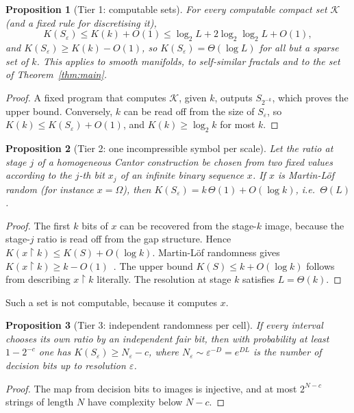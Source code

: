 \documentclass[11pt]{article}
\newtheorem{proposition}{Proposition}[section]
\theoremstyle{definition}\newtheorem{definition}{Definition}[section]
\theoremstyle{remark}\newtheorem*{remark}{Remark}
\newcommand{\Kc}{K}
\begin{document}
\begin{proposition}[Tier 1: computable sets]
\label{prop:tier1}
For every computable compact set $\mathcal K$ (and a fixed rule for discretising it),
\begin{equation}
\Kc(S_\varepsilon)\le\Kc(k)+O(1)\le\log_2L+2\log_2\log_2L+O(1),
\end{equation}
and $\Kc(S_\varepsilon)\ge\Kc(k)-O(1)$, so $\Kc(S_\varepsilon)=\Theta(\log L)$ for all but a sparse set of $k$. This
applies to smooth manifolds, to self-similar fractals and to the set of Theorem~\ref{thm:main}.
\end{proposition}
\begin{proof}
A fixed program that computes $\mathcal K$, given $k$, outputs $S_{2^{-k}}$, which proves the upper bound. Conversely, $k$ can be read
off from the size of $S_\varepsilon$, so $\Kc(k)\le\Kc(S_\varepsilon)+O(1)$, and $\Kc(k)\ge\log_2k$ for most $k$.
\end{proof}

\begin{proposition}[Tier 2: one incompressible symbol per scale]
\label{prop:tier2}
Let the ratio at stage $j$ of a homogeneous Cantor construction be chosen from two fixed values according to the
$j$-th bit $x_j$ of an infinite binary sequence $x$. If $x$ is Martin-L\"of random (for instance
$x=\Omega$), then $\Kc(S_\varepsilon)=k\,\Theta(1)+O(\log k)$, i.e.\ $\Theta(L)$.
\end{proposition}
\begin{proof}
The first $k$ bits of $x$ can be recovered from the stage-$k$ image, because the stage-$j$ ratio is read off from
the gap structure. Hence $\Kc(x\!\upharpoonright\!k)\le\Kc(S)+O(\log k)$. Martin-L\"of randomness gives
$\Kc(x\!\upharpoonright\!k)\ge k-O(1)$~\cite{Chaitin75,DowneyHirschfeldt}. The upper bound $\Kc(S)\le k+O(\log k)$ follows
from describing $x\!\upharpoonright\!k$ literally. The resolution at stage $k$ satisfies $L=\Theta(k)$.
\end{proof}
Such a set is not computable, because it computes $x$.

\begin{proposition}[Tier 3: independent randomness per cell]
\label{prop:tier3}
If every interval chooses its own ratio by an independent fair bit, then with probability at least $1-2^{-c}$
one has $\Kc(S_\varepsilon)\ge N_\varepsilon-c$, where $N_\varepsilon\sim\varepsilon^{-D}=e^{DL}$ is the number of decision bits
up to resolution $\varepsilon$.
\end{proposition}
\begin{proof}
The map from decision bits to images is injective, and at most $2^{N-c}$ strings of length $N$ have complexity
below $N-c$.
\end{proof}
\end{document}
